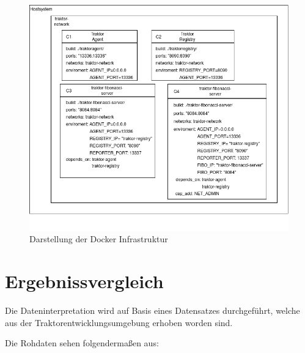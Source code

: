 \begin{figure}[]
	\centering
	\includegraphics[scale=0.5]{img/Evaluation/Docker-Compose-Vis.png}
	\caption[Visualisierung der Docker Infrastruktur]{Darstellung der Docker Infrastruktur}
	\label{fig:Docker-Compose-Vis}
\end{figure}

\section{Ergebnissvergleich}
\label{section:Ergebnissvergleich}
Die Dateninterpretation wird auf Basis eines Datensatzes durchgeführt, welche aus der Traktorentwicklungsumgebung erhoben worden sind. 

Die Rohdaten sehen folgendermaßen aus:


